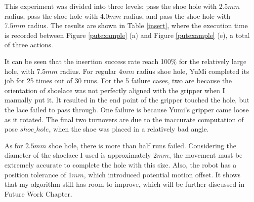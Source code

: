 This experiment was divided into three levels: pass the shoe hole with $2.5mm$ radius, pass the shoe hole with $4.0mm$ radius, and pass the shoe hole with $7.5mm$ radius. The results are shown in Table \ref{insert}, where the execution time is recorded between Figure \ref{putexample} (a) and Figure \ref{putexample} (e), a total of three actions. 

\begin{table}[H]
\centering
{}
\caption{The testing results of shoelace insertion}
\label{insert}
\end{table}

It can be seen that the insertion success rate reach 100\% for the relatively large hole, with $7.5mm$ radius. For regular $4mm$ radius shoe hole, YuMi completed its job for 25 times out of 30 runs. For the 5 failure cases, two are because the orientation of shoelace was not perfectly aligned with the gripper when I manually put it. It resulted in the end point of the gripper touched the hole, but the lace failed to pass through. One failure is because Yumi's gripper came loose as it rotated. The final two turnovers are due to the inaccurate computation of pose $shoe\_hole$, when the shoe was placed in a relatively bad angle.

As for $2.5mm$ shoe hole, there is more than half runs failed. Considering the diameter of the shoelace I used is approximately $2mm$, the movement must be extremely accurate to complete the hole with this size. Also, the robot has a position tolerance of $1mm$, which introduced potential motion offset. It shows that my algorithm still has room to improve, which will be further discussed in Future Work Chapter.

